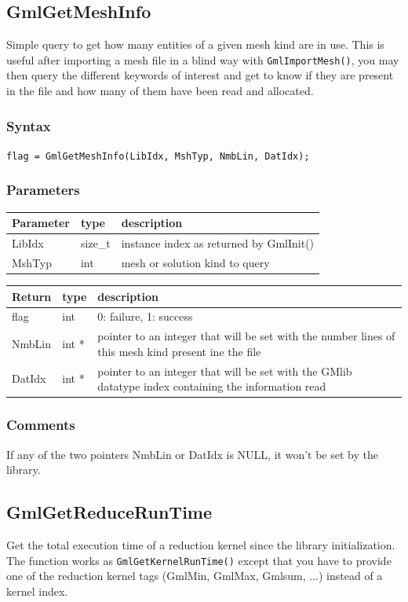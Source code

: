 \documentclass[a4paper,12pt]{article}
\begin{document}
\subsection{GmlGetMeshInfo}
Simple query to get how many entities of a given mesh kind are in use. This is useful after importing a mesh file in a blind way with {\tt GmlImportMesh()}, you may then query the different keywords of interest and get to know if they are present in the file and how many of them have been read and allocated.

\subsubsection*{Syntax}
{\tt flag = GmlGetMeshInfo(LibIdx, MshTyp, NmbLin, DatIdx);}

\subsubsection*{Parameters}
\begin{tabular}{|m{2cm}|m{1.5cm}|m{10.5cm}|}
\hline
Parameter  & type    & description \\
\hline
LibIdx     & size\_t & instance index as returned by GmlInit() \\
\hline
MshTyp     & int     & mesh or solution kind to query \\
\hline
\end{tabular}

\medskip

\begin{tabular}{|m{2cm}|m{1.5cm}|m{10.5cm}|}
\hline
Return     & type   & description \\
\hline
flag       & int    & 0: failure, 1: success \\
\hline
NmbLin     & int *   & pointer to an integer that will be set with the number lines of this mesh kind present ine the file \\
\hline
DatIdx     & int *   & pointer to an integer that will be set with the GMlib datatype index containing the information read \\
\hline
\end{tabular}

\subsubsection*{Comments}
If any of the two pointers NmbLin or DatIdx is NULL, it won't be set by the library.


\subsection{GmlGetReduceRunTime}
Get the total execution time of a reduction kernel since the library initialization. The function works as {\tt GmlGetKernelRunTime()} except that you have to provide one of the reduction kernel tags (GmlMin, GmlMax, Gmlsum, ...) instead of a kernel index.
\end{document}
